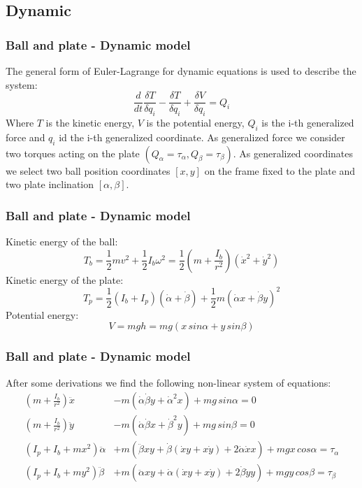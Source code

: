 \subsection{Dynamic}
\begin{frame}
\frametitle{Ball and plate - Dynamic model}
%
The general form of Euler-Lagrange for dynamic equations is used to describe the system:
%
\begin{equation}
	\frac{d}{dt}\frac{\delta T}{\delta q_i} - \frac{\delta T}{\delta q_i} + \frac{\delta V}{\delta q_i} = Q_i
\end{equation}
%
Where $T$ is the kinetic energy, $V$ is the potential energy, $Q_i$ is the i-th generalized force and $q_i$ id the i-th generalized coordinate. As generalized force we consider two torques acting on the plate $(Q_\alpha = \tau_\alpha, Q_\beta = \tau_\beta)$. As generalized coordinates we select two ball position coordinates $[x, y]$ on the frame fixed to the plate and two plate inclination $[\alpha, \beta]$.
\end{frame}
%
\begin{frame}
\frametitle{Ball and plate - Dynamic model}
%
Kinetic energy of the ball:
\begin{equation}
	T_{b} = \frac{1}{2}mv^2 + \frac{1}{2}I_b\omega^2 = \frac{1}{2}\left(m+\frac{I_b}{r^2}\right)\left(\dot{x}^2+\dot{y}^2\right)
\end{equation}
%
Kinetic energy of the plate:
\begin{equation}
	T_{p} = \frac{1}{2}\left(I_b + I_p\right)\left(\dot{\alpha} + \dot{\beta}\right) + \frac{1}{2}m\left(\dot{\alpha}x + \dot{\beta}y\right)^2
\end{equation}
%
Potential energy:
\begin{equation}
	V = mgh = mg(x\,sin\alpha + y\,sin\beta)
\end{equation}
\end{frame}
%
\begin{frame}
\frametitle{Ball and plate - Dynamic model}
%
After some derivations we find the following non-linear system of equations:
%
\begin{align}
	\left(m + \frac{I_b}{r^2}\right)\ddot{x} &- m\left(\dot{\alpha}\dot{\beta}y + \dot{\alpha}^2x\right)+mg\,sin\alpha = 0 \nonumber \\
	\left(m + \frac{I_b}{r^2}\right)\ddot{y} &- m\left(\dot{\alpha}\dot{\beta}x + \dot{\beta}^2y\right)+mg\,sin\beta = 0 \\
	\left(I_p + I_b + mx^2\right)\ddot{\alpha} &+ m\left(\ddot{\beta}xy + \dot{\beta}\left(\dot{x}y + x\dot{y}\right) + 2\dot{\alpha}\dot{x}x\right) +mgx\,cos{\alpha} = \tau_\alpha \nonumber \\
	\left(I_p + I_b + my^2\right)\ddot{\beta} &+ m\left(\ddot{\alpha}xy + \dot{\alpha}\left(\dot{x}y + x\dot{y}\right) + 2\dot{\beta}\dot{y}y\right) +mgy\,cos{\beta} = \tau_\beta \nonumber
\end{align}
\end{frame}
